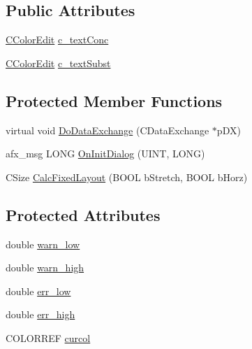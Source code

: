 \subsection*{Public Attributes}
\begin{DoxyCompactItemize}
\item 
\hyperlink{classCColorEdit}{CColorEdit} \hyperlink{classCDlgBarTop_ae5b7ad488c56456a821e7b62e5414bc9}{c\_\-textConc}
\item 
\hyperlink{classCColorEdit}{CColorEdit} \hyperlink{classCDlgBarTop_ad72ba99e097e6b29da3af65a5627d7e7}{c\_\-textSubst}
\end{DoxyCompactItemize}
\subsection*{Protected Member Functions}
\begin{DoxyCompactItemize}
\item 
virtual void \hyperlink{classCDlgBarTop_a8789c792cb851288eba24f118dcf9696}{DoDataExchange} (CDataExchange $\ast$pDX)
\item 
afx\_\-msg LONG \hyperlink{classCDlgBarTop_aff4c498f249600d6baed7435ed3fee95}{OnInitDialog} (UINT, LONG)
\item 
CSize \hyperlink{classCDlgBarTop_a87798945df5628e73326de8f9a28616f}{CalcFixedLayout} (BOOL bStretch, BOOL bHorz)
\end{DoxyCompactItemize}
\subsection*{Protected Attributes}
\begin{DoxyCompactItemize}
\item 
double \hyperlink{classCDlgBarTop_a44955d59681e44e2d28eb2e5cb9001b8}{warn\_\-low}
\item 
double \hyperlink{classCDlgBarTop_af80330c5513f5d9e1fbaa6a85657091e}{warn\_\-high}
\item 
double \hyperlink{classCDlgBarTop_aa7d6c3b4e42e89d0224e0c9443410b75}{err\_\-low}
\item 
double \hyperlink{classCDlgBarTop_ace74fac5678befd5df68bfe6714556a9}{err\_\-high}
\item 
COLORREF \hyperlink{classCDlgBarTop_ae3d18a7b1e0f9e44dd258619bc8e3376}{curcol}
\end{DoxyCompactItemize}


